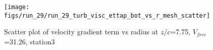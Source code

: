 \begin{figure}[H]
\centering
\texttt{[image: figs/run\_29/run\_29\_turb\_visc\_ettap\_bot\_vs\_r\_mesh\_scatter]}
\caption{Scatter plot of velocity gradient term vs radius at $z/c$=7.75, $V_{free}$=31.26, station3}
\label{fig:run_29_turb_visc_ettap_bot_vs_r_mesh_scatter}
\end{figure}



